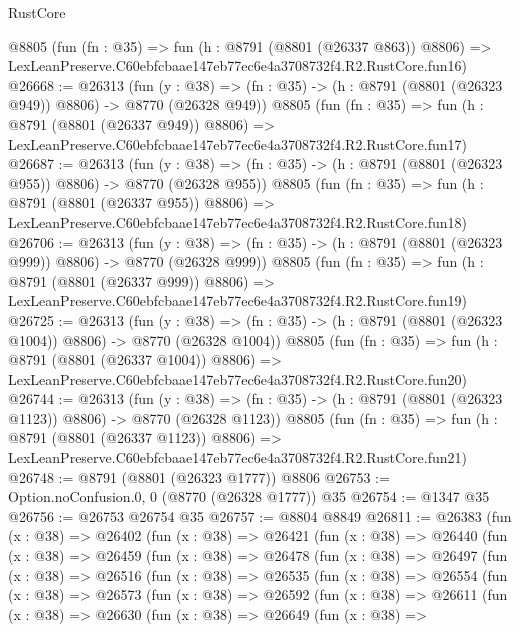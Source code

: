 \begin{lexlean}{RustCore}
\begin{coremodule}
    @8805
    (fun (fn : @35) =>
    fun (h : @8791 (@8801 (@26337 @863)) @8806) =>
    LexLeanPreserve.C60ebfcbaae147eb77ec6e4a3708732f4.R2.RustCore.fun16)
@26668 := @26313
    (fun (y : @38) => (fn : @35) -> (h : @8791 (@8801 (@26323 @949)) @8806) -> @8770 (@26328 @949))
    @8805
    (fun (fn : @35) =>
    fun (h : @8791 (@8801 (@26337 @949)) @8806) =>
    LexLeanPreserve.C60ebfcbaae147eb77ec6e4a3708732f4.R2.RustCore.fun17)
@26687 := @26313
    (fun (y : @38) => (fn : @35) -> (h : @8791 (@8801 (@26323 @955)) @8806) -> @8770 (@26328 @955))
    @8805
    (fun (fn : @35) =>
    fun (h : @8791 (@8801 (@26337 @955)) @8806) =>
    LexLeanPreserve.C60ebfcbaae147eb77ec6e4a3708732f4.R2.RustCore.fun18)
@26706 := @26313
    (fun (y : @38) => (fn : @35) -> (h : @8791 (@8801 (@26323 @999)) @8806) -> @8770 (@26328 @999))
    @8805
    (fun (fn : @35) =>
    fun (h : @8791 (@8801 (@26337 @999)) @8806) =>
    LexLeanPreserve.C60ebfcbaae147eb77ec6e4a3708732f4.R2.RustCore.fun19)
@26725 := @26313
    (fun (y : @38) =>
    (fn : @35) -> (h : @8791 (@8801 (@26323 @1004)) @8806) -> @8770 (@26328 @1004))
    @8805
    (fun (fn : @35) =>
    fun (h : @8791 (@8801 (@26337 @1004)) @8806) =>
    LexLeanPreserve.C60ebfcbaae147eb77ec6e4a3708732f4.R2.RustCore.fun20)
@26744 := @26313
    (fun (y : @38) =>
    (fn : @35) -> (h : @8791 (@8801 (@26323 @1123)) @8806) -> @8770 (@26328 @1123))
    @8805
    (fun (fn : @35) =>
    fun (h : @8791 (@8801 (@26337 @1123)) @8806) =>
    LexLeanPreserve.C60ebfcbaae147eb77ec6e4a3708732f4.R2.RustCore.fun21)
@26748 := @8791 (@8801 (@26323 @1777)) @8806
@26753 := Option.noConfusion.{0, 0} (@8770 (@26328 @1777)) @35
@26754 := @1347 @35
@26756 := @26753 @26754 @35
@26757 := @8804 @8849
@26811 := @26383
    (fun (x : @38) =>
    @26402
      (fun (x : @38) =>
      @26421
        (fun (x : @38) =>
        @26440
          (fun (x : @38) =>
          @26459
            (fun (x : @38) =>
            @26478
              (fun (x : @38) =>
              @26497
                (fun (x : @38) =>
                @26516
                  (fun (x : @38) =>
                  @26535
                    (fun (x : @38) =>
                    @26554
                      (fun (x : @38) =>
                      @26573
                        (fun (x : @38) =>
                        @26592
                          (fun (x : @38) =>
                          @26611
                            (fun (x : @38) =>
                            @26630
                              (fun (x : @38) =>
                              @26649
                                (fun (x : @38) =>

\end{coremodule}
\end{lexlean}
